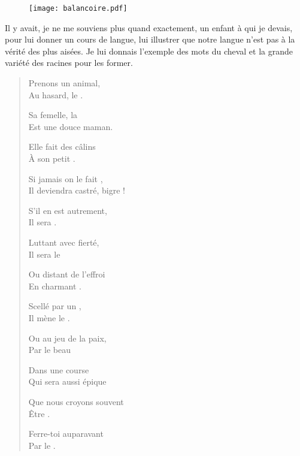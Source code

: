 \begin{figure}[h]
  \centering
  \texttt{[image: balancoire.pdf]}
  \captionsetup{labelformat=empty}
  \caption[Idéotexte de ]{}
\end{figure}

\begin{prose}
  Il y avait, je ne me souviens plus quand exactement, un enfant à qui je devais, pour lui donner un cours de langue, lui illustrer que notre langue n’est pas à la vérité des plus aisées. Je lui donnais l’exemple des mots du cheval et la grande variété des racines pour les former.
\end{prose}


\begin{verse}%
  \distique%
  Prenons un animal,\\  %
  Au hasard, le .

  Sa femelle, la \\  %
  Est une douce maman.

  Elle fait des câlins\\  %
  À son petit .

  Si jamais on le fait ,\\  %
  Il deviendra castré, bigre !

  S’il en est autrement,\\  %
  Il sera .

  Luttant avec fierté,\\  %
  Il sera le 

  Ou distant de l’effroi\\  %
  En charmant .

  Scellé par un ,\\  %
  Il mène le .

  Ou au jeu de la paix,\\  %
  Par le beau 

  Dans une course \\  %
  Qui sera aussi épique

  Que nous croyons souvent\\  %
  Être .

  Ferre-toi auparavant\\  %
  Par le .
\end{verse}



